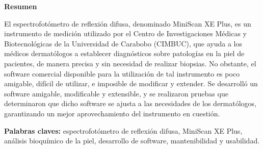 \begin{center}
	\membrete
	\vfill
	\textbf{Resumen}
\end{center}

	\noindent
El espectrofot\'{o}metro de reflexi\'{o}n difusa, denominado MiniScan XE Plus, es un instrumento de medici\'{o}n utilizado por el Centro de Investigaciones M\'{e}dicas y Biotecnol\'{o}gicas de la Universidad de Carabobo (CIMBUC), que ayuda a los m\'{e}dicos dermat\'{o}logos a establecer diagn\'{o}sticos sobre patolog\'{i}as en la piel de pacientes, de manera precisa y sin necesidad de realizar biopsias. No obstante, el software comercial disponible para la utilizaci\'{o}n de tal instrumento es poco amigable, dif\'{i}cil de utilizar, e imposible de modificar y extender. Se desarroll\'{o} un software amigable, modificable y extensible, y se realizaron pruebas que determinaron que dicho software se ajusta a las necesidades de los dermat\'{o}logos, garantizando un mejor aprovechamiento del instrumento en cuesti\'{o}n.

	\noindent
	\textbf{Palabras claves:} espectrofot\'{o}metro de reflexi\'{o}n difusa, MiniScan XE Plus, an\'{a}lisis bioqu\'{i}mico de la piel, desarrollo de software, mantenibilidad y usabilidad.

\vfill
\begin{minipage}[t]{0.45\textwidth}
	\begin{flushleft}
		\begin{center}
			\autor
		\end{center}
	\end{flushleft}
\end{minipage}
\begin{minipage}[t]{0.45\textwidth}
	\begin{flushright}
		\begin{center}
			\tutores
		\end{center}
	\end{flushright}
\end{minipage}
\vfill